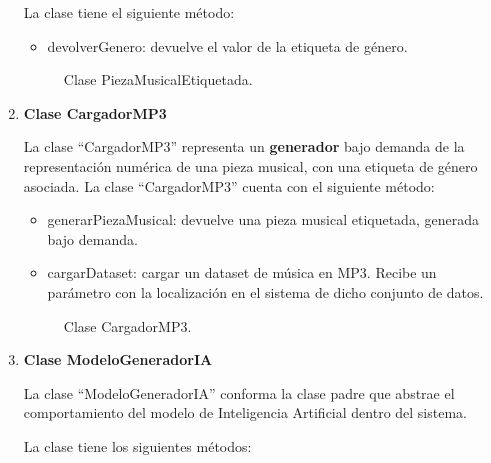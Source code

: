 \begin{enumerate}
  La clase tiene el siguiente método:

  \begin{itemize}
      \item devolverGenero: devuelve el valor de la etiqueta de género.
  \end{itemize}

  \begin{figure}[H]
    \centering
    
    \caption{Clase PiezaMusicalEtiquetada.}
  \end{figure}

  \item \textbf{Clase CargadorMP3}

  La clase ``CargadorMP3'' representa un \textbf{generador} bajo demanda de la representación numérica de una pieza musical, con una etiqueta de género asociada.
  La clase ``CargadorMP3'' cuenta con el siguiente método:

  \begin{itemize}
      \item generarPiezaMusical: devuelve una pieza musical etiquetada, generada bajo demanda.
      \item cargarDataset: cargar un dataset de música en MP3. Recibe un parámetro con la localización en el sistema de dicho conjunto de datos.
  \end{itemize}

  \begin{figure}[H]
    \centering
    
    \caption{Clase CargadorMP3.}
  \end{figure}

  \item \textbf{Clase ModeloGeneradorIA}

  La clase ``ModeloGeneradorIA'' conforma la clase padre que abstrae el comportamiento del modelo de Inteligencia Artificial dentro del sistema.

  La clase tiene los siguientes métodos:


\end{enumerate}
